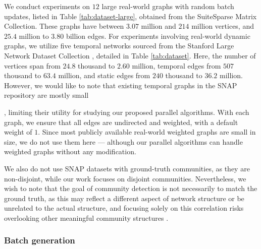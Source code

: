 We conduct experiments on $12$ large real-world graphs with random batch updates, listed in Table \ref{tab:dataset-large}, obtained from the SuiteSparse Matrix Collection. These graphs have between $3.07$ million and $214$ million vertices, and $25.4$ million to $3.80$ billion edges. For experiments involving real-world dynamic graphs, we utilize five temporal networks sourced from the Stanford Large Network Dataset Collection \cite{snapnets}, detailed in Table \ref{tab:dataset}. Here, the number of vertices span from $24.8$ thousand to $2.60$ million, temporal edges from $507$ thousand to $63.4$ million, and static edges from $240$ thousand to $36.2$ million. However, we would like to note that existing temporal graphs in the SNAP repository \cite{snapnets} are mostly small, limiting their utility for studying our proposed parallel algorithms. With each graph, we ensure that all edges are undirected and weighted, with a default weight of $1$. Since most publicly available real-world weighted graphs are small in size, we do not use them here --- although our parallel algorithms can handle weighted graphs without any modification.

We also do not use SNAP datasets with ground-truth communities, as they are non-disjoint, while our work focuses on disjoint communities. Nevertheless, we wish to note that the goal of community detection is not necessarily to match the ground truth, as this may reflect a different aspect of network structure or be unrelated to the actual structure, and focusing solely on this correlation risks overlooking other meaningful community structures \cite{peel2017ground}.


\subsubsection{Batch generation}
\label{sec:batch-generation}

